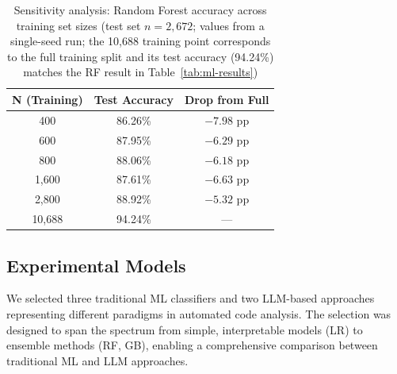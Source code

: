 \documentclass[acmsmall]{acmart}
\begin{document}
\begin{table}[htbp]
\centering
\caption{Sensitivity analysis: Random Forest accuracy across training set
sizes (test set $n=2{,}672$; values from a single-seed run; the 10,688 training
point corresponds to the full training split and its test accuracy (94.24\%)
matches the RF result in Table~\ref{tab:ml-results})}
\label{tab:sensitivity}
\begin{tabular}{@{}ccc@{}}
\toprule
N (Training) & Test Accuracy & Drop from Full \\
\midrule
400   & 86.26\% & $-7.98$ pp \\
600   & 87.95\% & $-6.29$ pp \\
800   & 88.06\% & $-6.18$ pp \\
1,600 & 87.61\% & $-6.63$ pp \\
2,800 & 88.92\% & $-5.32$ pp \\
10,688 & 94.24\% & --- \\
\bottomrule
\end{tabular}
\end{table}

\subsection{Experimental Models}

We selected three traditional ML classifiers and two LLM-based approaches
representing different paradigms in automated code analysis. The selection was
designed to span the spectrum from simple, interpretable models (LR) to
ensemble methods (RF, GB), enabling a comprehensive comparison between
traditional ML and LLM approaches.
\end{document}
